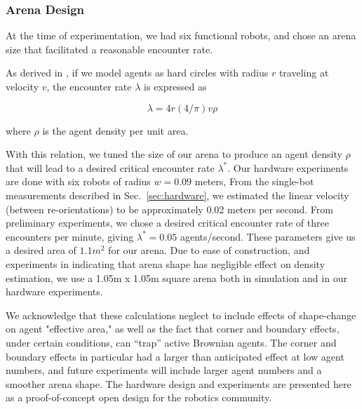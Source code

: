 \documentclass[runningheads]{llncs}
\begin{document}
\subsubsection{Arena Design} At the time of experimentation, we had six functional robots, and chose an arena size that facilitated a reasonable encounter rate.

 As derived in \cite{mayya2019closed}, if we model agents as hard circles with radius $r$ traveling at velocity $v$, the encounter rate $\lambda$ is expressed as

 \begin{equation}
\lambda = 4 r (4/\pi) v \rho
 \end{equation}

 where $\rho$ is the agent density per unit area.

 With this relation, we tuned the size of our arena to produce an agent density $\rho$ that will lead to a desired critical encounter rate $\lambda^*$. Our hardware experiments are done with six robots of radius $w=0.09$ meters, From the single-bot measurements described in Sec.~\ref{sec:hardware}, we estimated the linear velocity (between re-orientations) to be approximately 0.02 meters per second. From preliminary experiments, we chose a desired critical encounter rate of three encounters per minute, giving $\lambda^* = 0.05$ agents/second. These parameters give us a desired area of $1.1 m^2$ for our arena. Due to ease of construction, and experiments in \cite{pavlic2021quorum} indicating that arena shape has negligible effect on density estimation, we use a 1.05m x 1.05m square arena both in simulation and in our hardware experiments.

 We acknowledge that these calculations neglect to include effects of shape-change on agent "effective area," as well as the fact that corner and boundary effects, under certain conditions, can ``trap'' active Brownian agents. The corner and boundary effects in particular had a larger than anticipated effect at low agent numbers, and future experiments will include larger agent numbers and a smoother arena shape. The hardware design and experiments are presented here as a proof-of-concept open design for the robotics community.
\end{document}
